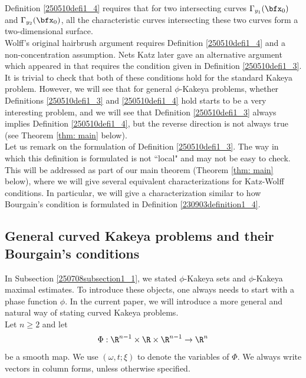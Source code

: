 \documentclass{article}
\numberwithin{equation}{section}
\theoremstyle{plain}
\begin{document}
Definition \ref{250510defi1_4} requires that for two intersecting curves $\Gamma_{y_1}(\bfx_0)$ and $\Gamma_{y_2}(\bfx_0)$, all the characteristic curves intersecting these two curves form a two-dimensional surface.  \\



Wolff's original hairbrush argument \cite{Wol95} requires Definition \ref{250510defi1_4} and a non-concentration assumption. Nets Katz later gave an alternative argument which appeared in \cite{Wis05} that requires the condition given in Definition \ref{250510defi1_3}. It is trivial to check that both of these conditions hold for the standard Kakeya problem. However, we will see that for general $\phi$-Kakeya problems, whether Definitions \ref{250510defi1_3} and \ref{250510defi1_4} hold starts to be a very interesting problem, and we will see that Definition \ref{250510defi1_3} always implies Definition \ref{250510defi1_4}, but the reverse direction is not always true (see Theorem \ref{thm: main} below). \\




Let us remark on the formulation of Definition \ref{250510defi1_3}. The way in which this definition is formulated is not ``local" and may not be easy to check. This will be addressed as part of our main theorem (Theorem \ref{thm: main} below), where we will give several equivalent characterizations for Katz-Wolff conditions. In particular, we will give a characterization similar to how Bourgain's condition is formulated in Definition \ref{230903definition1_4}. 








\subsection{General curved Kakeya problems and their Bourgain's conditions}\label{250929sub1_3}


In Subsection \ref{250708subsection1_1}, we stated $\phi$-Kakeya sets and $\phi$-Kakeya maximal estimates. To introduce these objects, one always needs to start with a phase function $\phi$. In the current paper, we will introduce a more general and natural way of stating curved Kakeya problems. \\


Let $n\ge 2$ and let 
\begin{equation}
\Phi:\R^{n-1}\times\R\times\R^{n-1}\rightarrow \R^n
\end{equation}
be a smooth map. We use $(\omega, t; \xi)$ to denote the variables of $\Phi$. We always write vectors in column forms, unless otherwise specified. 
	
\end{document}
